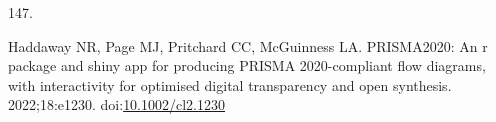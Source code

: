 \documentclass[
]{book}
\newlength{\cslhangindent}
\newlength{\csllabelwidth}
\newlength{\cslentryspacingunit} %
\newenvironment{CSLReferences}[2] %
 {%
  \setlength{\parindent}{0pt}
  \ifodd #1
  \let\oldpar\par
  \def\par{\hangindent=\cslhangindent\oldpar}
  \fi
  \setlength{\parskip}{#2\cslentryspacingunit}
 }%
 {}
\newcommand{\CSLLeftMargin}[1]{\parbox[t]{\csllabelwidth}{#1}}
\newcommand{\CSLRightInline}[1]{\parbox[t]{\linewidth - \csllabelwidth}{#1}\break}
\begin{document}
\begin{CSLReferences}{0}{0}
\leavevmode{}%
\CSLLeftMargin{147. }%
\CSLRightInline{Haddaway NR, Page MJ, Pritchard CC, McGuinness LA. PRISMA2020: An r package and shiny app for producing PRISMA 2020-compliant flow diagrams, with interactivity for optimised digital transparency and open synthesis. 2022;18:e1230. doi:\href{https://doi.org/10.1002/cl2.1230}{10.1002/cl2.1230}}

\end{CSLReferences}


\newpage
\end{document}
